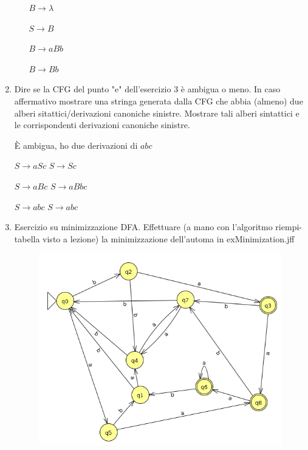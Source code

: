 \begin{enumerate}
\begin{enumerate}
        $B \rightarrow \lambda$

        $S \rightarrow B$

        $B \rightarrow aBb$

        $B \rightarrow Bb$
    \end{enumerate}

  \item  Dire se la CFG del punto "e" dell'esercizio 3 è ambigua o meno. In caso affermativo mostrare una stringa generata dalla CFG che abbia (almeno) due alberi sitattici/derivazioni canoniche sinistre. Mostrare tali alberi sintattici e le corrispondenti derivazioni canoniche sinistre. 

    È ambigua, ho due derivazioni di $abc$

    $S \rightarrow aSc$ \hspace{3cm} $S \rightarrow Sc$

    $S \rightarrow aBc$ \hspace{3cm} $S \rightarrow aBbc$

    $S \rightarrow abc$ \hspace{3cm} $S \rightarrow abc$

  \item Esercizio su minimizzazione DFA. Effettuare (a mano con l'algoritmo riempi-tabella visto a lezione) la minimizzazione dell'automa in exMinimization.jff

      \begin{figure}[ht]
        \includegraphics[scale = 0.4]{media/exMinimization.jff.png}
        \centering
      \end{figure}


\end{enumerate}
